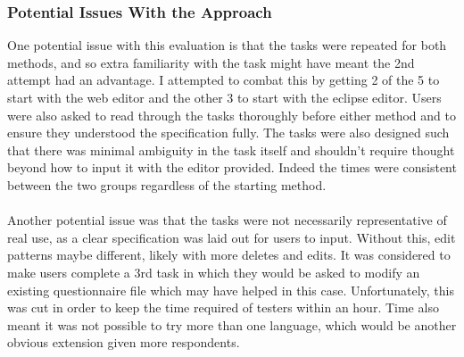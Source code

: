\documentclass{article}
\begin{document}
%

% 




\subsubsection{Potential Issues With the Approach}
One potential issue with this evaluation is that the tasks were repeated for both methods, and so extra familiarity with the task might have meant the 2nd attempt had an advantage. I attempted to combat this by getting 2 of the 5 to start with the web editor and the other 3 to start with the eclipse editor. Users were also asked to read through the tasks thoroughly before either method and to ensure they understood the specification fully. The tasks were also designed such that there was minimal ambiguity in the task itself and shouldn't require thought beyond how to input it with the editor provided. Indeed the times were consistent between the two groups regardless of the starting method.
\\
\\
Another potential issue was that the tasks were not necessarily representative of real use, as a clear specification was laid out for users to input. Without this, edit patterns maybe different, likely with more deletes and edits. It was considered to make users complete a 3rd task in which they would be asked to modify an existing questionnaire file which may have helped in this case. Unfortunately, this was cut in order to keep the time required of testers within an hour. Time also meant it was not possible to try more than one language, which would be another obvious extension given more respondents.
\end{document}
